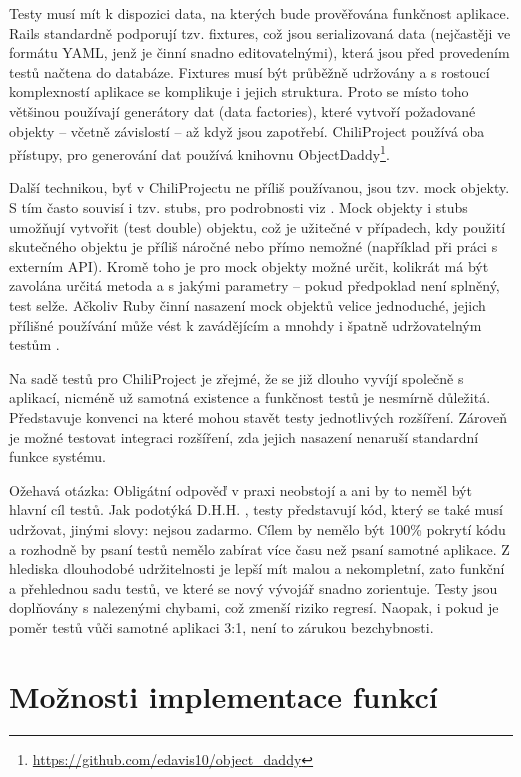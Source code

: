 \documentclass[thesis=B,czech]{FITthesis}[2012/05/02]
\begin{document}
Testy musí mít k dispozici data, na kterých bude prověřována
funkčnost aplikace. Rails standardně podporují tzv. fixtures, což jsou
serializovaná data (nejčastěji ve formátu \gls{YAML}, jenž je činní
snadno editovatelnými), která jsou před provedením testů načtena do
databáze. Fixtures musí být průběžně udržovány a s rostoucí komplexností
aplikace se komplikuje i jejich struktura. Proto se místo toho většinou
používají generátory dat (data factories), které vytvoří požadované
objekty -- včetně závislostí -- až když jsou zapotřebí. ChiliProject
používá oba přístupy, pro generování dat používá knihovnu
ObjectDaddy\footnote{\url{https://github.com/edavis10/object_daddy}}.

Další technikou, byť v ChiliProjectu ne příliš používanou, jsou tzv.
mock objekty. S tím často souvisí i tzv. stubs, pro podrobnosti viz
\citep{FowlerMocks}. Mock objekty i stubs umožňují vytvořit
 (test double) objektu, což je užitečné
v případech, kdy použití skutečného objektu je příliš náročné nebo přímo
nemožné (například při práci s externím API). Kromě toho je pro
mock objekty možné určit, kolikrát má být zavolána určitá metoda a
s jakými parametry -- pokud předpoklad není splněný, test selže. Ačkoliv
Ruby činní nasazení mock objektů velice jednoduché, jejich přílišné
používání může vést k zavádějícím a mnohdy i špatně udržovatelným testům
\citep{Parsons2011}.

Na sadě testů pro ChiliProject je zřejmé, že se již dlouho vyvíjí
společně s aplikací, nicméně už samotná existence a funkčnost testů je
nesmírně důležitá. Představuje konvenci na které mohou stavět testy
jednotlivých rozšíření. Zároveň je možné testovat integraci rozšíření,
zda jejich nasazení nenaruší standardní funkce systému.

Ožehavá otázka:  Obligátní odpověď 
v praxi neobstojí a ani by to neměl být hlavní cíl testů. Jak podotýká
D.H.H. \citep{HanssonTestingTSA}, testy představují kód, který se
také musí udržovat, jinými slovy: nejsou zadarmo. Cílem by nemělo být
100\% pokrytí kódu a rozhodně by psaní testů nemělo zabírat více času
než psaní samotné aplikace. Z hlediska dlouhodobé udržitelnosti je lepší
mít malou a nekompletní, zato funkční a přehlednou sadu testů, ve které
se nový vývojář snadno zorientuje. Testy jsou doplňovány s nalezenými
chybami, což zmenší riziko regresí. Naopak, i pokud je poměr testů vůči
samotné aplikaci 3:1, není to zárukou bezchybnosti.

\section{Možnosti implementace funkcí}
\end{document}
